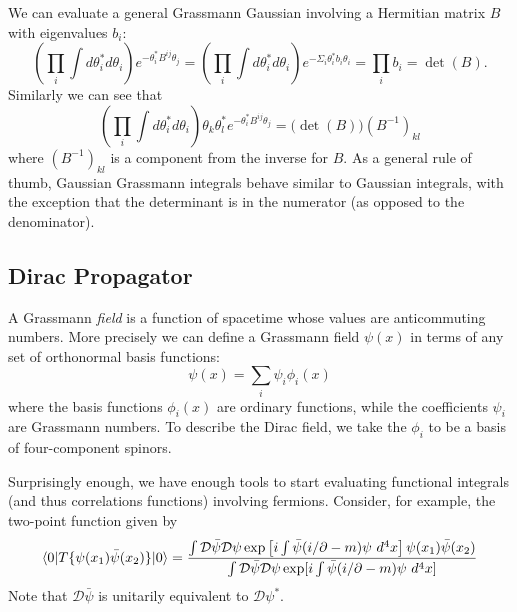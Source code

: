 We can evaluate a general Grassmann Gaussian involving a
Hermitian matrix $B$ with eigenvalues $b_{i}$:
\begin{equation}%
\left(\prod_{i}\int d\theta^{*}_{i}d\theta_{i}\right)
e^{-\theta^{*}_{i}B^{ij}\theta_{j}} = \left(\prod_{i}\int
d\theta^{*}_{i}d\theta_{i}\right)e^{-\Sigma_{i}\theta^{*}_{i}b_{i}\theta_{i}}
= \prod_{i}b_{i} = \det(B).
\end{equation}
Similarly we can see that
\begin{equation}%
\left(\prod_{i}\int d\theta^{*}_{i}d\theta_{i}\right)\theta_{k}\theta^{*}_{l}e^{-\theta^{*}_{i}B^{ij}\theta_{j}}=\Big(\det(B)\Big)(B^{-1})_{kl}
\end{equation}
where $(B^{-1})_{kl}$ is a component from the inverse for $B$. As
a general rule of thumb, Gaussian Grassmann integrals behave
similar to Gaussian integrals, with the exception that the
determinant is in the numerator (as opposed to the denominator).

\subsection{Dirac Propagator}

A Grassmann \emph{field} is a function of spacetime whose values
are anticommuting numbers. More precisely we can define a
Grassmann field $\psi(x)$ in terms of any set of orthonormal
basis functions:
\begin{equation}%
\psi(x) = \sum_{i} \psi_{i}\phi_{i}(x)
\end{equation}
where the basis functions $\phi_{i}(x)$ are ordinary functions,
while the coefficients $\psi_{i}$ are Grassmann numbers. To
describe the Dirac field, we take the $\phi_{i}$ to be a basis of
four-component spinors.

Surprisingly enough, we have enough tools to start evaluating
functional integrals (and thus correlations functions) involving
fermions. Consider, for example, the two-point function given by
\begin{equation}%
\<0|T\{\psi(x_{1})\bar{\psi}(x_{2})\}|0\> = \frac{\int\mathcal{D}\bar{\psi}\mathcal{D}\psi\exp\left[i\int\bar{\psi}(i\slash{\partial}-m)\psi~d^{4}x\right]\psi(x_{1})\bar{\psi}(x_{2})}{\int\mathcal{D}\bar{\psi}\mathcal{D}\psi\exp[i\int\bar{\psi}(i\slash{\partial}-m)\psi~d^{4}x]}
\end{equation}
Note that $\mathcal{D}\bar{\psi}$ is unitarily equivalent to
$\mathcal{D}\psi^{*}$. 
